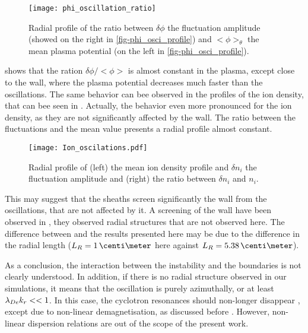   \begin{figure}[hbtp]
    \centering
    \texttt{[image: phi\_oscillation\_ratio]}
    \caption{Radial profile of the ratio between $\delta \phi$ the fluctuation amplitude (showed on the right in \cref{fig-phi_osci_profile}) and $<\phi>_{\theta}$  the mean plasma potential (on the left in \cref{fig-phi_osci_profile}).}
    \label{fig-ratio}
  \end{figure}
  
   shows that the ration $\delta \phi / <\phi>$ is almost constant in the plasma, except close to the wall, where the plasma potential decreases much faster than the oscillations.
  The same behavior can bee observed in the profiles of the ion density, that can bee seen in .
  Actually, the behavior even more pronounced for the ion density, as they are not significantly affected by the wall.
  The ratio between the fluctuations and the mean value presents a radial profile almost constant.
  
  \begin{figure}[hbtp]
    \centering
    \texttt{[image: Ion\_oscilations.pdf]}
    \caption{Radial profile of (left) the mean ion density profile and $\delta n_i$ the fluctuation amplitude and (right) the ratio between $\delta n_i$ and $n_i$.}
    \label{fig-ion_oscilation}
  \end{figure}
  
  \vspace{1em}
  This may suggest that the sheaths screen significantly the wall from the oscillations, that are not affected by it.
  A screening of the wall have been observed in \citet{janhunen2018}, they observed radial structures that are not observed here.
  The difference between  \citet{janhunen2018} and the results presented here may be due to the difference in the radial length ($L_R =1 \,\centi\meter$ here against $L_R = 5.38\,\centi\meter$).
  
  As a conclusion, the interaction between the instability and the boundaries is not clearly understood.
  In addition, if there is no radial structure observed in our simulations, it means that the oscillation is purely azimuthally, or at least $\lambda_{De} k_r <<1$.
  In this case, the cyclotron resonances should non-longer disappear \citep{ducrocq2006}, except due to non-linear demagnetisation, as discussed before \citep{boeuf2018,taccogna2019}.
  However, non-linear dispersion relations are out of the scope of the present work.
  

